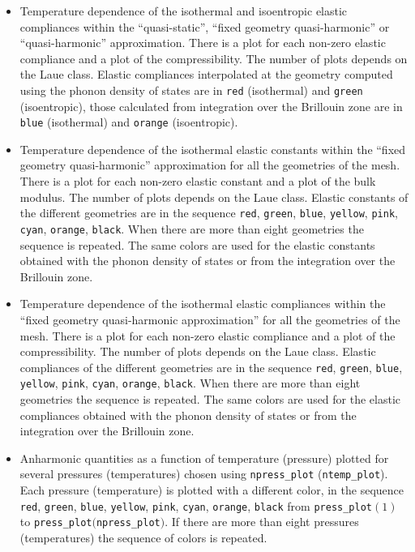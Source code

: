 \documentclass[12pt,a4paper,twoside]{report}
\begin{document}
\begin{itemize}
\item
Temperature dependence of the isothermal and isoentropic elastic compliances
within the ``quasi-static'', ``fixed geometry quasi-harmonic'' or
``quasi-harmonic'' approximation. There is a plot for each non-zero
elastic compliance and a plot of the compressibility. The number of plots 
depends on the Laue class. 
Elastic compliances
interpolated at the geometry computed using the phonon density of states 
are in \texttt{red} (isothermal) and \texttt{green} (isoentropic), 
those calculated from integration over the 
Brillouin zone are in \texttt{blue} (isothermal) and \texttt{orange} 
(isoentropic).

\item
Temperature dependence of the isothermal elastic constants within the 
``fixed geometry quasi-harmonic'' approximation for all the geometries of
the mesh. There is a plot for each non-zero
elastic constant and a plot of the bulk modulus. The number of plots 
depends on the Laue class. 
Elastic constants of the different geometries are in the sequence 
\texttt{red}, \texttt{green}, \texttt{blue}, \texttt{yellow}, 
\texttt{pink}, \texttt{cyan}, \texttt{orange}, \texttt{black}. When there
are more than eight geometries the sequence is repeated. 
The same colors are used for the elastic constants obtained with the
phonon density of states or from the integration over the Brillouin zone.

\item
Temperature dependence of the isothermal elastic compliances within the 
``fixed geometry quasi-harmonic approximation'' for all the geometries of
the mesh. There is a plot for each non-zero
elastic compliance and a plot of the compressibility. The number of plots 
depends on the Laue class. 
Elastic compliances of the different geometries are in the sequence 
\texttt{red}, \texttt{green}, \texttt{blue}, \texttt{yellow}, 
\texttt{pink}, \texttt{cyan}, \texttt{orange}, \texttt{black}. When there
are more than eight geometries the sequence is repeated. 
The same colors are used for the elastic compliances obtained with the
phonon density of states or from the integration over the Brillouin zone.

\item
Anharmonic quantities as a function of temperature (pressure)
plotted for several pressures (temperatures) chosen using 
\texttt{npress\_plot} (\texttt{ntemp\_plot}). 
Each pressure (temperature) is
plotted with a different color, in the sequence \texttt{red}, 
\texttt{green}, \texttt{blue}, \texttt{yellow},
\texttt{pink}, \texttt{cyan}, \texttt{orange}, \texttt{black} from
\texttt{press\_plot}$(1)$ to \texttt{press\_plot}$($\texttt{npress\_plot}$)$.
If there are more than eight pressures (temperatures)
the sequence of colors is repeated.

\end{itemize}
\end{document}
